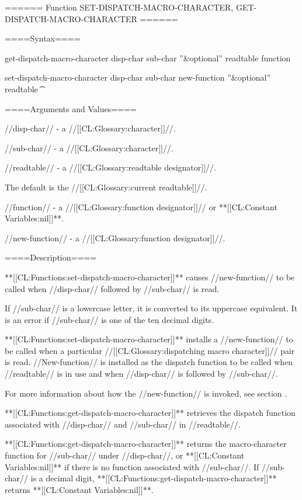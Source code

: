 ====== Function SET-DISPATCH-MACRO-CHARACTER, GET-DISPATCH-MACRO-CHARACTER ======

====Syntax====

\DefunWithValues get-dispatch-macro-character {disp-char sub-char ''&optional'' readtable} {function}

\DefunWithValues set-dispatch-macro-character {disp-char sub-char new-function ''&optional'' readtable} {\t}

====Arguments and Values====

//disp-char// - a //[[CL:Glossary:character]]//.

//sub-char// - a //[[CL:Glossary:character]]//.

//readtable// - a //[[CL:Glossary:readtable designator]]//.

The default is the //[[CL:Glossary:current readtable]]//.

//function// - a //[[CL:Glossary:function designator]]// or **[[CL:Constant Variables:nil]]**.

//new-function// - a //[[CL:Glossary:function designator]]//.

====Description====

**[[CL:Functions:set-dispatch-macro-character]]** causes //new-function// to be called when //disp-char// followed by //sub-char// is read.

If //sub-char// is a lowercase letter, it is converted to its uppercase equivalent. It is an error if //sub-char// is one of the ten decimal digits.

**[[CL:Functions:set-dispatch-macro-character]]** installs a //new-function// to be called when a particular //[[CL:Glossary:dispatching macro character]]// pair is read. //New-function// is installed as the dispatch function to be called when //readtable// is in use and when //disp-char// is followed by //sub-char//.

For more information about how the //new-function// is invoked, see section {\secref\MacroChars}.

**[[CL:Functions:get-dispatch-macro-character]]** retrieves the dispatch function associated with //disp-char// and //sub-char// in //readtable//.

**[[CL:Functions:get-dispatch-macro-character]]** returns the macro-character function for //sub-char// under //disp-char//, or **[[CL:Constant Variables:nil]]** if there is no function associated with //sub-char//. If //sub-char// is a decimal digit, **[[CL:Functions:get-dispatch-macro-character]]** returns **[[CL:Constant Variables:nil]]**.


